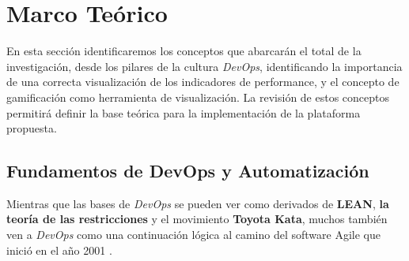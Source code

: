 \documentclass[journal]{IEEEtran}
\begin{document}
\section{\textbf{\Large Marco Teórico}}

En esta sección identificaremos los conceptos que abarcarán el total de la investigación, desde los pilares de la cultura \textit{DevOps}, identificando la importancia de una correcta visualización de los indicadores de performance, y el concepto de gamificación como herramienta de visualización. La revisión de estos conceptos permitirá definir la base teórica para la implementación de la plataforma propuesta.

\subsection{\textbf{Fundamentos de DevOps y Automatización}}

\begin{tcolorbox}[colback=gray!10, colframe=black, left=2mm, right=2mm]
    \small %
    \ttfamily %
    \raggedright %
    Mientras que las bases de \textit{DevOps} se pueden ver como derivados de \textbf{LEAN}, \textbf{la teoría de las restricciones} y el movimiento \textbf{Toyota Kata}, muchos también ven a \textit{DevOps} como una continuación lógica al camino del software Agile que inició en el año 2001 \cite{kim2021devops}.
\end{tcolorbox}
\end{document}
